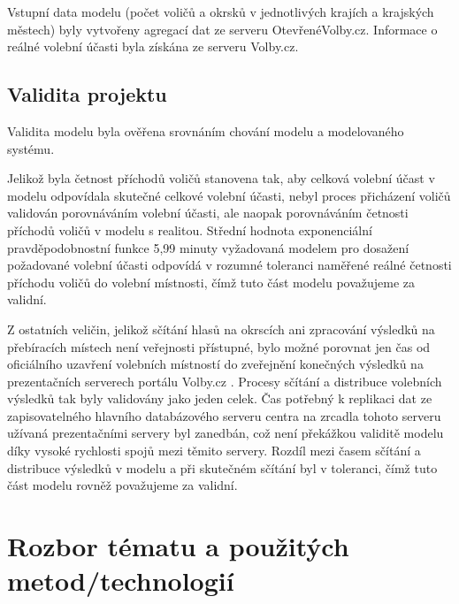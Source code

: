 \documentclass[12pt,a4paper,titlepage,final]{article}
\begin{document}
Vstupní data modelu (počet voličů a okrsků v jednotlivých krajích a krajských městech) byly vytvořeny agregací dat ze serveru OtevřenéVolby.cz. \cite{otevrenevolby} Informace o reálné volební účasti byla získána ze serveru Volby.cz. \cite{volby}

\subsection{Validita projektu}

Validita modelu \cite[str. 37]{ims} byla ověřena srovnáním chování \cite[str. 24]{ims} modelu a modelovaného systému.

Jelikož byla četnost příchodů voličů stanovena tak, aby celková volební účast v modelu odpovídala skutečné celkové volební účasti, nebyl proces přicházení voličů validován porovnáváním volební účasti, ale naopak porovnáváním četnosti příchodů voličů v modelu s realitou. Střední hodnota exponenciální pravděpodobnostní funkce \cite[str. 91]{ims} 5,99 minuty vyžadovaná modelem pro dosažení požadované volební účasti odpovídá v rozumné toleranci naměřené reálné četnosti příchodu voličů do volební místnosti, čímž tuto část modelu považujeme za validní.

Z ostatních veličin, jelikož sčítání hlasů na okrscích ani zpracování výsledků na přebíracích místech není veřejnosti přístupné, bylo možné porovnat jen čas od oficiálního uzavření volebních místností do zveřejnění konečných výsledků na prezentačních serverech portálu Volby.cz \cite{volby}. Procesy sčítání a distribuce volebních výsledků tak byly validovány jako jeden celek. Čas potřebný k replikaci dat ze zapisovatelného hlavního databázového serveru centra na zrcadla tohoto serveru užívaná prezentačními servery byl zanedbán, což není překážkou validitě modelu díky vysoké rychlosti spojů mezi těmito servery. Rozdíl mezi časem sčítání a distribuce výsledků v modelu a při skutečném sčítání byl v toleranci, čímž tuto část modelu rovněž považujeme za validní.

\section{Rozbor tématu a použitých metod/technologií} \label{rozbor}
\end{document}
